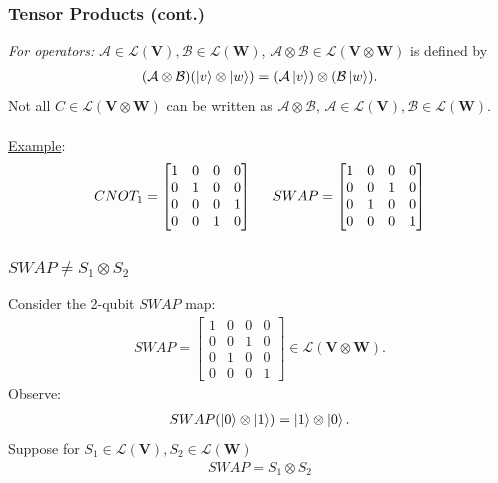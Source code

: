 \documentclass{beamer}
\theoremstyle{definition}
\newcommand{\V}{\mathbf{V}}
\newcommand{\W}{\mathbf{W}}
\newcommand{\A}{\mathcal{A}}
\newcommand{\B}{\mathcal{B}}
\newcommand{\lag}{\mathcal{L}}
\begin{document}
\begin{frame}
\frametitle{Tensor Products (cont.)}
\textit{For operators:} $\A \in \mathfrak{\lag}(\V), \mathcal{B} \in \mathfrak{\lag}(\W)$, $\A\otimes \B \in \mathfrak{\lag}(\V \otimes \W)$ is defined by
\begin{align*}
(\A \otimes \B)(\ket{v}\otimes \ket{w}) = (\A\ket{v})\otimes (\B\ket{w}).
\end{align*}
Not all $C \in \mathfrak{\lag}(\V\otimes \W)$ can be written as $\A \otimes \B$, $\A \in \mathfrak{\lag}(\V), \mathcal{B} \in \mathfrak{\lag}(\W)$.\\
$\,$\\
\underline{Example}:
\begin{align*}
CNOT_1 = \begin{bmatrix}
1&0&0&0\\
0&1&0&0\\
0&0&0&1\\
0&0&1&0
\end{bmatrix} 
\hspace{0.5cm}
SWAP = 
\begin{bmatrix}
1&0&0&0\\
0&0&1&0\\
0&1&0&0\\
0&0&0&1
\end{bmatrix} 
\end{align*}
\end{frame}


\begin{frame}
\frametitle{$SWAP \neq S_1 \otimes S_2$}
Consider the 2-qubit $SWAP$ map:
\begin{align*}
SWAP = 
\begin{bmatrix}
1&0&0&0\\
0&0&1&0\\
0&1&0&0\\
0&0&0&1
\end{bmatrix} \in \lag(\V\otimes \W).
\end{align*}
Observe: 
\begin{align*}
SWAP(\left\vert{0}\right\rangle\otimes \left\vert{1}\right\rangle) = \left\vert{1}\right\rangle\otimes \left\vert{0}\right\rangle.
\end{align*}
Suppose for $S_1 \in \lag(\V), S_2 \in \lag(\W)$
\begin{align*}
SWAP = S_1 \otimes S_2
\end{align*}
\end{frame}
\end{document}
